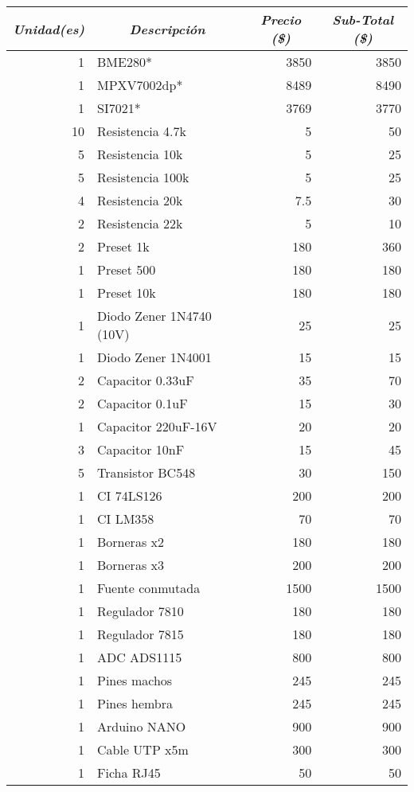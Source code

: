 \begin{table}[H]
	\centering
	\begin{tabular}{|r|l|r|r|}
		\hline
		\multicolumn{1}{|c|}{\textit{\textbf{Unidad(es)}}} & \multicolumn{1}{c|}{\textit{\textbf{Descripción}}} & \multicolumn{1}{c|}{\textit{\textbf{Precio (\$)}}} & \multicolumn{1}{c|}{\textit{\textbf{Sub-Total  (\$)}}} \\ \hline
		1 & BME280* & 3850 & 3850 \\ \hline
		1 & MPXV7002dp* & 8489 & 8490 \\ \hline
		1 & SI7021* & 3769 & 3770 \\ \hline
		10 & Resistencia 4.7k & 5 & 50 \\ \hline
		5 & Resistencia 10k & 5 & 25 \\ \hline
		5 & Resistencia 100k & 5 & 25 \\ \hline
		4 & Resistencia 20k & 7.5 & 30 \\ \hline
		2 & Resistencia 22k & 5 & 10 \\ \hline
		2 & Preset 1k & 180 & 360 \\ \hline
		1 & Preset 500 & 180 & 180 \\ \hline
		1 & Preset 10k & 180 & 180 \\ \hline
		1 & Diodo Zener 1N4740 (10V) & 25 & 25 \\ \hline
		1 & Diodo Zener 1N4001 & 15 & 15 \\ \hline
		2 & Capacitor 0.33uF & 35 & 70 \\ \hline
		2 & Capacitor 0.1uF & 15 & 30 \\ \hline
		1 & Capacitor 220uF-16V & 20 & 20 \\ \hline
		3 & Capacitor 10nF & 15 & 45 \\ \hline
		5 & Transistor BC548 & 30 & 150 \\ \hline
		1 & CI 74LS126 & 200 & 200 \\ \hline
		1 & CI LM358 & 70 & 70 \\ \hline
		1 & Borneras x2 & 180 & 180 \\ \hline
		1 & Borneras x3 & 200 & 200 \\ \hline
		1 & Fuente conmutada & 1500 & 1500 \\ \hline
		1 & Regulador 7810 & 180 & 180 \\ \hline
		1 & Regulador 7815 & 180 & 180 \\ \hline
		1 & ADC ADS1115 & 800 & 800 \\ \hline
		1 & Pines machos & 245 & 245 \\ \hline
		1 & Pines hembra & 245 & 245 \\ \hline
		1 & Arduino NANO & 900 & 900 \\ \hline
		1 & Cable UTP x5m & 300 & 300 \\ \hline
		1 & Ficha RJ45 & 50 & 50 \\ \hline
		

\end{tabular}
\end{table}
